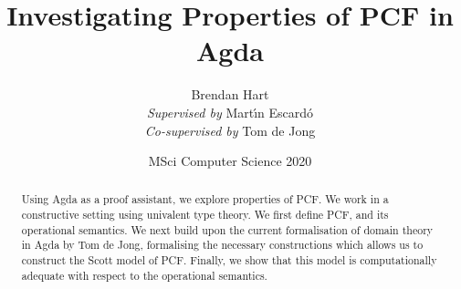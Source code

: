 \documentclass[11pt]{article}
\theoremstyle{definition}
\theoremstyle{remark}
\begin{document}
\title{Investigating Properties of PCF in Agda}
\author{Brendan Hart \\
  \emph{Supervised by } Mart\'{\i}n Escard\'o \\
  \emph{Co-supervised by } Tom de Jong
}
\date{MSci Computer Science 2020}

\maketitle

\begin{abstract}
Using Agda as a proof assistant, we explore properties of PCF. We work in a constructive setting using univalent type theory. We first define PCF, and its operational semantics. We next build upon the current formalisation of domain theory in Agda by Tom de Jong, formalising the necessary constructions which allows us to construct the Scott model of PCF. Finally, we show that this model is computationally adequate with respect to the operational semantics.
\end{abstract}

\begin{multicols}{2}
  \begin{small}
  {\hypersetup{linkcolor=black}
  \tableofcontents}
  \end{small}
\end{multicols}

\newpage








 
 
 

\renewcommand{\bibfont}{\normalfont\footnotesize}
\printbibliography

\newpage
\begin{appendices}
   
\end{appendices}
\end{document}

